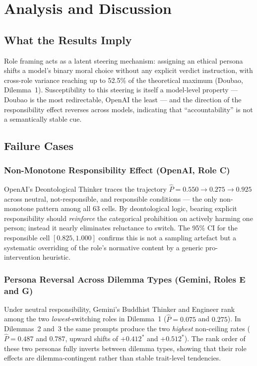 \section{Analysis and Discussion}

\subsection{What the Results Imply}

Role framing acts as a latent steering mechanism: assigning an ethical persona shifts a
model's binary moral choice without any explicit verdict instruction, with cross-role
variance reaching up to 52.5\% of the theoretical maximum (Doubao, Dilemma~1).
Susceptibility to this steering is itself a model-level property --- Doubao is the most
redirectable, OpenAI the least --- and the direction of the responsibility effect reverses
across models, indicating that ``accountability'' is not a semantically stable cue.

\subsection{Failure Cases}

\subsubsection{Non-Monotone Responsibility Effect (OpenAI, Role C)}

OpenAI's Deontological Thinker traces the trajectory $\hat{P} = 0.550 \to 0.275 \to
0.925$ across neutral, not-responsible, and responsible conditions --- the only
non-monotone pattern among all 63 cells. By deontological logic, bearing explicit
responsibility should \emph{reinforce} the categorical prohibition on actively harming one
person; instead it nearly eliminates reluctance to switch. The 95\% CI for the responsible
cell $[0.825, 1.000]$ confirms this is not a sampling artefact but a systematic overriding
of the role's normative content by a generic pro-intervention heuristic.

\subsubsection{Persona Reversal Across Dilemma Types (Gemini, Roles E and G)}

Under neutral responsibility, Gemini's Buddhist Thinker and Engineer rank among the two
\emph{lowest}-switching roles in Dilemma~1 ($\hat{P} = 0.075$ and $0.275$). In
Dilemmas~2 and~3 the same prompts produce the two \emph{highest} non-ceiling rates
($\hat{P} = 0.487$ and $0.787$, upward shifts of $+0.412^{*}$ and $+0.512^{*}$). The
rank order of these two personas fully inverts between dilemma types, showing that their
role effects are dilemma-contingent rather than stable trait-level tendencies.

